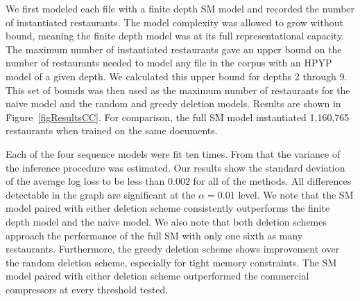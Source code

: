 
We first modeled each file with a finite depth SM model and recorded the number of instantiated restaurants.  The model complexity was allowed to grow without bound, meaning the finite depth model was at its full representational capacity.  The maximum number of instantiated restaurants gave an upper bound on the number of restaurants needed to model any file in the corpus with an HPYP model of a given depth.  We calculated this upper bound for depths 2 through 9.  This set of bounds was then used as the maximum number of restaurants for the naive model and the random and greedy deletion models.  Results are shown in Figure~\ref{figResultsCC}.  For comparison, the full SM model instantiated 1,160,765 restaurants when trained on the same documents.  

Each of the four sequence models were fit ten times.  From that the variance of the inference procedure was estimated.  Our results show the standard deviation of the average log loss to be less than $0.002$ for all of the methods.  All differences detectable in the graph are significant at the $\alpha = 0.01$ level. We note that the SM model paired with either deletion scheme consistently outperforms the finite depth model and the naive model.  We also note that both deletion schemes approach the performance of the full SM with only one sixth as many restaurants.  Furthermore, the greedy deletion scheme shows improvement over the random deletion scheme, especially for tight memory constraints.  The SM model paired with either deletion scheme outperformed the commercial compressors at every threshold tested.
